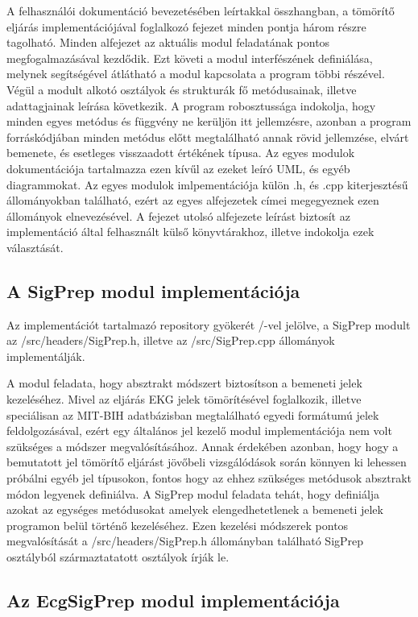 \documentclass[oneside,titlepage,12pt,a4paper]{report}
\begin{document}
A felhasználói dokumentáció bevezetésében leírtakkal összhangban, a tömörítő eljárás implementációjával foglalkozó fejezet minden pontja három részre tagolható. Minden alfejezet az aktuális modul feladatának pontos megfogalmazásával kezdődik. Ezt követi a modul interfészének definiálása, melynek segítségével átlátható a modul kapcsolata a program többi részével. Végül a modult alkotó osztályok és strukturák fő metódusainak, illetve adattagjainak leírása következik. A program robosztussága indokolja, hogy minden egyes metódus és függvény ne kerüljön itt jellemzésre, azonban a program forráskódjában minden metódus előtt megtalálható annak rövid jellemzése, elvárt bemenete, és esetleges visszaadott értékének típusa. Az egyes modulok dokumentációja tartalmazza ezen kívűl az ezeket leíró UML, és egyéb diagrammokat. Az egyes modulok imlpementációja külön .h, és .cpp kiterjesztésű állományokban található, ezért az egyes alfejezetek címei megegyeznek ezen állományok elnevezésével. A fejezet utolsó alfejezete leírást biztosít az implementáció által felhasznált külső könyvtárakhoz, illetve indokolja ezek választását.

\subsection{A SigPrep modul implementációja}

Az implementációt tartalmazó repository gyökerét /-vel jelölve, a SigPrep modult  az /src/headers/SigPrep.h, illetve az /src/SigPrep.cpp állományok implementálják. \par A modul feladata, hogy absztrakt módszert biztosítson a bemeneti jelek kezeléséhez. 
Mivel az eljárás EKG jelek tömörítésével foglalkozik, illetve speciálisan az MIT-BIH adatbázisban megtalálható egyedi formátumú jelek feldolgozásával, 
ezért egy általános jel kezelő modul implementációja nem volt szükséges a módszer megvalósításához. Annak érdekében azonban, hogy 
hogy a bemutatott jel tömörítő eljárást jövőbeli vizsgálódások során könnyen ki lehessen próbálni egyéb jel típusokon, fontos hogy az ehhez szükséges metódusok absztrakt módon legyenek definiálva.
A SigPrep modul feladata tehát, hogy definiálja azokat az egységes metódusokat amelyek elengedhetetlenek a bemeneti jelek programon belül történő kezeléséhez. Ezen kezelési módszerek pontos megvalósítását a
/src/headers/SigPrep.h állományban található SigPrep osztályból származtatatott osztályok írják le. \par 


\subsection{Az EcgSigPrep modul implementációja}
\end{document}
